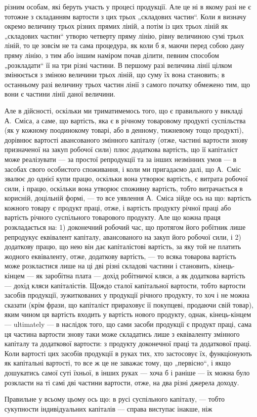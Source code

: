 \parcont{}  %
різним особам, які беруть участь у процесі продукції. Але це ні в якому
разі не є тотожне з складанням вартости з цих трьох „складових частин“.
Коли я визначу окремо величину трьох різних прямих ліній, а
потім із цих трьох ліній як „складових частин“ утворю четверту пряму
лінію, рівну величиною сумі трьох ліній, то це зовсім не та сама процедура,
як коли б я, маючи перед собою дану пряму лінію, з тим або
іншим наміром почав ділити, певним способом „розкладати“ її на три
різні частини. В першому разі величина лінії цілком змінюється з зміною
величини трьох ліній, що суму їх вона становить; в останньому разі
величину трьох частин лінії з самого початку обмежено тим, що вони
є частини лінії даної величини.

Але в дійсності, оскільки ми триматимемось того, що є правильного
у викладі А.~Сміса, а саме, що  вартість,
яка є в річному товаровому продукті суспільства (як у кожному поодинокому
товарі, або в денному, тижневому тощо продукті), дорівнює вартості
авансованого змінного капіталу (отже, частині вартости знову призначеної
на закуп робочої сили) плюс додаткова вартість, що її капіталіст може
реалізувати — за простої репродукції та за інших незмінних умов — в засобах
свого особистого споживання, і коли ми пригадаємо далі, що А.~Сміс звалює до однієї купи працю, оскільки вона утворює вартість, є
витрата робочої сили, і працю, оскільки вона утворює споживну вартість,
тобто витрачається в корисній, доцільній формі, — то все уявлення
А.~Сміса зійде ось на що: вартість кожного товару є продукт праці,
отже, і вартість продукту річної праці або вартість річного суспільного
товарового продукту. Але що кожна праця розкладається на: 1) доконечний
робочий час, що протягом його робітник лише репродукує еквівалент
капіталу, авансованого на закуп його робочої сили, і 2) додаткову працю,
що нею він дає капіталістові вартість, за яку той не платить жодного
еквіваленту, отже, додаткову вартість, — то всяка товарова вартість може
розкластися лише на ці дві різні складові частини і становить, кінець-кінцем —
як заробітна плата — дохід робітничої кляси, а як додаткова вартість —
дохід кляси капіталістів. Щождо сталої капітальної вартости, тобто вартости
засобів продукції, зужиткованих у продукції річного продукту, то
хоч і не можна сказати (крім фрази, що капіталіст прираховує її покупцеві,
продаючи свій товар), яким чином ця вартість входить у вартість
нового продукту, однак, кінець-кінцем — ultimately — в наслідок того, що
сами засоби продукції є продукт праці, сама ця частина вартости знову
таки може складатись лише з еквіваленту змінного капіталу та додаткової
вартости: з продукту доконечної праці та додаткової праці. Коли
вартості цих засобів продукції в руках тих, хто застосовує їх, функціонують
як капітальні вартості, то все ж це не заважає тому, що „первісно“,
і якщо дошукатись самої суті їхньої, в інших руках — хоча б і раніше — їх
можна було розкласти на ті самі дві частини вартости, отже, на два
різні джерела доходу.

Правильне у всьому цьому ось що: в русі суспільного капіталу, —
тобто сукупности індивідуальних капіталів — справа виступає інакше, ніж
\parbreak{}  %
